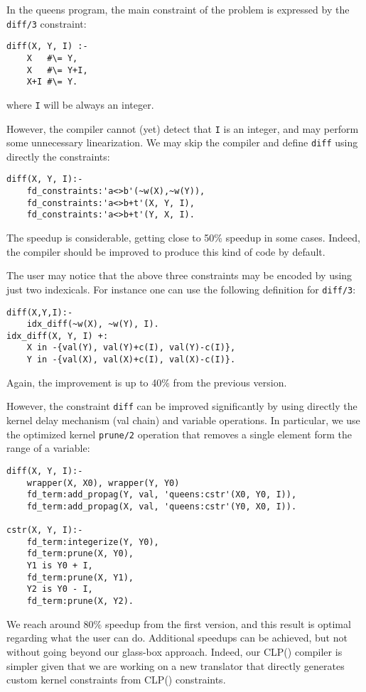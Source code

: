 \documentclass{llncs}
\newcommand{\clpfd}{CLP()\xspace}
\newcommand{\fd}{\xspace}
\begin{document}
In the queens program, the main constraint of the problem is expressed
by the \verb|diff/3| constraint:
\begin{lstlisting}
diff(X, Y, I) :-
    X   #\= Y,
    X   #\= Y+I,
    X+I #\= Y.
\end{lstlisting}
where \verb!I! will be always an integer.

However, the compiler cannot (yet) detect that \verb!I! is an integer,
and may perform some unnecessary linearization. We may skip the
compiler and define \verb!diff! using directly the \fd constraints:
\begin{lstlisting}
diff(X, Y, I):-
    fd_constraints:'a<>b'(~w(X),~w(Y)),
    fd_constraints:'a<>b+t'(X, Y, I),
    fd_constraints:'a<>b+t'(Y, X, I).
\end{lstlisting}
The speedup is considerable, getting close to 50\% speedup in some
cases. Indeed, the compiler should be improved to produce this kind of
code by default.

The user may notice that the above three constraints may be encoded by
using just two indexicals. For instance one can use the following
definition for \verb|diff/3|:
\begin{lstlisting}
diff(X,Y,I):-
    idx_diff(~w(X), ~w(Y), I).
idx_diff(X, Y, I) +:
    X in -{val(Y), val(Y)+c(I), val(Y)-c(I)},
    Y in -{val(X), val(X)+c(I), val(X)-c(I)}.
\end{lstlisting}
Again, the improvement is up to 40\% from the previous version.

However, the constraint \verb!diff! can be improved significantly by using
directly the kernel delay mechanism (val chain) and \fd variable
operations. In particular, we use the optimized kernel \verb|prune/2|
operation that removes a single element form the range of a
variable:
\begin{lstlisting}
diff(X, Y, I):-
	wrapper(X, X0), wrapper(Y, Y0)
  	fd_term:add_propag(Y, val, 'queens:cstr'(X0, Y0, I)),
  	fd_term:add_propag(X, val, 'queens:cstr'(Y0, X0, I)).

cstr(X, Y, I):-
  	fd_term:integerize(Y, Y0),
  	fd_term:prune(X, Y0),
  	Y1 is Y0 + I,
  	fd_term:prune(X, Y1),
  	Y2 is Y0 - I,
  	fd_term:prune(X, Y2).
\end{lstlisting}
We reach around 80\% speedup from the first version, and this result
is optimal regarding what the user can do. Additional speedups can be
achieved, but not without going beyond our glass-box approach.
Indeed, our \clpfd compiler is simpler given that we are working on a
new translator that directly generates custom kernel constraints from
\clpfd constraints.
\end{document}
